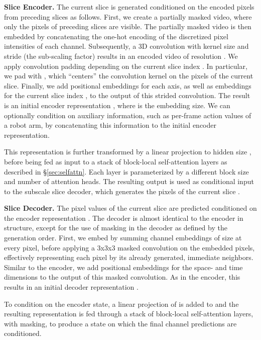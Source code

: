 \documentclass{article} \usepackage{iclr2020_conference,times}
\begin{document}
\textbf{Slice Encoder.}
The current slice  is generated conditioned on the encoded pixels from preceding slices as follows. First, we create a partially masked video, where only the pixels of preceding slices  are visible. The partially masked video is then embedded by concatenating the one-hot encoding of the discretized pixel intensities of each channel. Subsequently, a 3D convolution with kernel size  and stride   (the sub-scaling factor) results in an encoded video of resolution . We apply convolution padding depending on the current slice index . In particular, we pad with , which ``centers'' the convolution kernel on the pixels of the current slice. Finally, we add positional embeddings for each axis, as well as embeddings for the current slice index  , to the output of this strided convolution. The result is an initial encoder representation , where  is the embedding size. We can optionally condition on auxiliary information, such as per-frame action values of a robot arm, by concatenating this information to the initial encoder representation.

This representation is further transformed by a linear projection to hidden size , before being fed as input to a stack of  block-local self-attention layers as described in \S\ref{sec:selfattn}. Each layer is parameterized by a different block size and number of attention heads. The resulting output  is used as conditional input to the subscale slice decoder, which generates the pixels of the current slice . 

\textbf{Slice Decoder.}
The pixel values of the current slice  are predicted conditioned on the encoder representation . The decoder is almost identical to the encoder in structure, except for the use of masking in the decoder as defined by the generation order.
First, we embed  by summing  channel embeddings of size  at every pixel, before applying a 3x3x3 masked convolution \citep{Oord2016PixelCNN} on the embedded pixels, effectively representing each pixel by its already generated, immediate neighbors. Similar to the encoder, we add positional embeddings for the space- and time dimensions to the output of this masked convolution. As in the encoder, this results in an initial decoder representation .

To condition on the encoder state, a linear projection of  is added to  and the resulting representation is fed through a stack of  block-local self-attention layers, with masking, to produce a state  on which the final channel predictions are conditioned.
\end{document}
